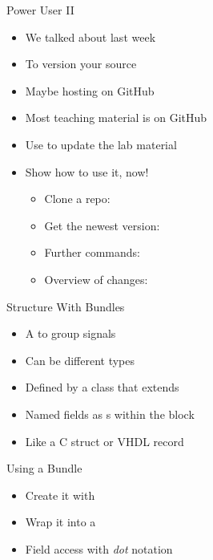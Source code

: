 \begin{frame}[fragile]{Power User II}
\begin{itemize}
\item We talked about  last week
\item To version your source
\item Maybe hosting on GitHub
\item Most teaching material is on GitHub
\item Use  to update the lab material
\item Show how to use it, now!
\begin{itemize}
\item Clone a repo: 
\item Get the newest version: 
\item Further commands: 
\item Overview of changes: 
\end{itemize}
\end{itemize}
\end{frame}

\begin{frame}[fragile]{Structure With Bundles}
\begin{itemize}
\item A  to group signals
\item Can be different types
\item Defined by a class that extends 
\item Named fields as s within the block
\item Like a C struct or VHDL record
\end{itemize}
\end{frame}

\begin{frame}[fragile]{Using a Bundle}
\begin{itemize}
\item Create it with 
\item Wrap it into a 
\item Field access with \emph{dot} notation
\end{itemize}
\end{frame}



